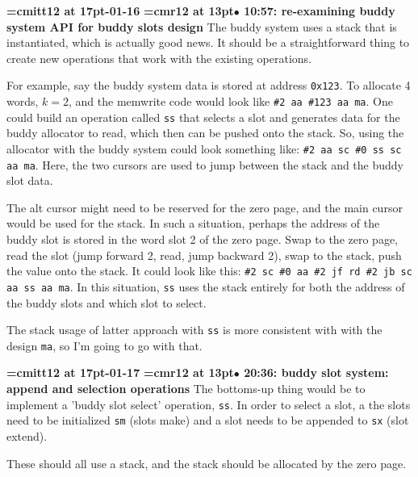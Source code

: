 {\medskip\noindent\bf\font\titlefont=cmitt12 at 17pt-01-16}\medskip
{\smallskip\noindent\bf\font\titlefont=cmr12 at 13pt\titlefont $\bullet$ 10:57: re-examining buddy system API for buddy slots design}\smallskip
The buddy system uses a stack that is instantiated, which is actually good news. It should be a straightforward thing to create new operations that work with the existing operations.
\par

For example, say the buddy system data is stored at address {\tt 0x123}. To allocate 4 words, $k = 2$, and the memwrite code would look like {\tt \#2 aa \#123 aa ma}. One could build an operation called {\tt ss} that selects a slot and generates data for the buddy allocator to read, which then can be pushed onto the stack. So, using the allocator with the buddy system could look something like: {\tt \#2 aa sc \#0 ss sc aa ma}. Here, the two cursors are used to jump between the stack and the buddy slot data.
\par

The alt cursor might need to be reserved for the zero page, and the main cursor would be used for the stack. In such a situation, perhaps the address of the buddy slot is stored in the word slot 2 of the zero page. Swap to the zero page, read the slot (jump forward 2, read, jump backward 2), swap to the stack, push the value onto the stack. It could look like this: {\tt \#2 sc \#0 aa \#2 jf rd \#2 jb sc aa ss aa ma}. In this situation, {\tt ss} uses the stack entirely for both the address of the buddy slots and which slot to select.
\par

The stack usage of latter approach with {\tt ss} is more consistent with with the design {\tt ma}, so I'm going to go with that.
\par

{\medskip\noindent\bf\font\titlefont=cmitt12 at 17pt-01-17}\medskip
{\smallskip\noindent\bf\font\titlefont=cmr12 at 13pt\titlefont $\bullet$ 20:36: buddy slot system: append and selection operations}\smallskip
The bottoms-up thing would be to implement a 'buddy slot select' operation, {\tt ss}. In order to select a slot, a the slots need to be initialized {\tt sm} (slots make) and a slot needs to be appended to {\tt sx} (slot extend).
\par

These should all use a stack, and the stack should be allocated by the zero page.
\par

